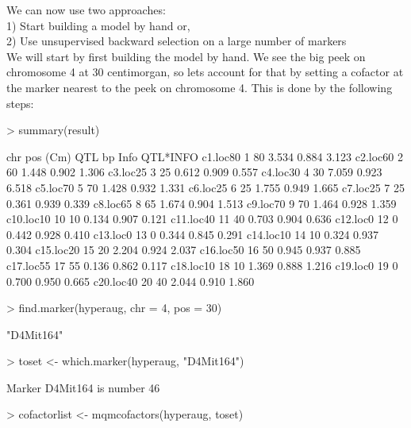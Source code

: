 \documentclass[11pt]{article}
\begin{document}
We can now use two approaches:\\
1) Start building a model by hand or,\\
2) Use unsupervised backward selection on a large number of markers\\
We will start by first building the model by hand. We see the big peek on chromosome 4 at 30 centimorgan, so lets account for that by setting a cofactor at the marker nearest to the peek on chromosome 4. This is done by the following steps:
\begin{Schunk}
\begin{Sinput}
> summary(result)
\end{Sinput}
\begin{Soutput}
          chr pos (Cm) QTL bp  Info QTL*INFO
c1.loc80    1       80  3.534 0.884    3.123
c2.loc60    2       60  1.448 0.902    1.306
c3.loc25    3       25  0.612 0.909    0.557
c4.loc30    4       30  7.059 0.923    6.518
c5.loc70    5       70  1.428 0.932    1.331
c6.loc25    6       25  1.755 0.949    1.665
c7.loc25    7       25  0.361 0.939    0.339
c8.loc65    8       65  1.674 0.904    1.513
c9.loc70    9       70  1.464 0.928    1.359
c10.loc10  10       10  0.134 0.907    0.121
c11.loc40  11       40  0.703 0.904    0.636
c12.loc0   12        0  0.442 0.928    0.410
c13.loc0   13        0  0.344 0.845    0.291
c14.loc10  14       10  0.324 0.937    0.304
c15.loc20  15       20  2.204 0.924    2.037
c16.loc50  16       50  0.945 0.937    0.885
c17.loc55  17       55  0.136 0.862    0.117
c18.loc10  18       10  1.369 0.888    1.216
c19.loc0   19        0  0.700 0.950    0.665
c20.loc40  20       40  2.044 0.910    1.860
\end{Soutput}
\begin{Sinput}
> find.marker(hyperaug, chr = 4, pos = 30)
\end{Sinput}
\begin{Soutput}
[1] "D4Mit164"
\end{Soutput}
\begin{Sinput}
> toset <- which.marker(hyperaug, "D4Mit164")
\end{Sinput}
\begin{Soutput}
Marker D4Mit164 is number 46 
\end{Soutput}
\begin{Sinput}
> cofactorlist <- mqmcofactors(hyperaug, toset)
\end{Sinput}
\end{Schunk}
\clearpage
\end{document}
